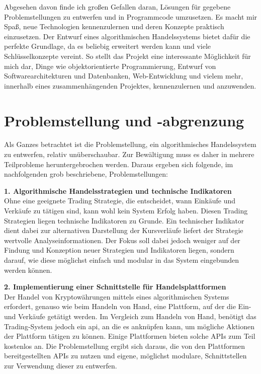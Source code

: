 \documentclass[oneside]{ausarbeitung}
\begin{document}
Abgesehen davon finde ich großen Gefallen daran, Lösungen für gegebene Problemstellungen zu entwerfen und in Programmcode umzusetzen. Es macht mir Spaß, neue Technologien kennenzulernen und deren Konzepte praktisch einzusetzen. Der Entwurf eines algorithmischen Handelssystems bietet dafür die perfekte Grundlage, da es beliebig erweitert werden kann und viele Schlüsselkonzepte vereint. So stellt das Projekt eine interessante Möglichkeit für mich dar, Dinge wie objektorientierte Programmierung, Entwurf von Softwarearchitekturen und Datenbanken, Web-Entwicklung und vielem mehr, innerhalb eines zusammenhängenden Projektes, kennenzulernen und anzuwenden.

\section{Problemstellung und -abgrenzung}
\label{sec:problemstellung}

Als Ganzes betrachtet ist die Problemstellung, ein algorithmisches Handelssystem zu entwerfen, relativ unüberschaubar. Zur Bewältigung muss es daher in mehrere Teilprobleme heruntergebrochen werden. Daraus ergeben sich folgende, im nachfolgenden grob beschriebene, Problemstellungen:

\textbf{1. Algorithmische Handelsstrategien und technische Indikatoren} \\
Ohne eine geeignete Trading Strategie, die entscheidet, wann Einkäufe und Verkäufe zu tätigen sind, kann wohl kein System Erfolg haben. Diesen Trading Strategien liegen technische Indikatoren zu Grunde. Ein technischer Indikator dient dabei zur alternativen Darstellung der Kursverläufe liefert der Strategie wertvolle Analyseinformationen. Der Fokus soll dabei jedoch weniger auf der Findung und Konzeption neuer Strategien und Indikatoren liegen, sondern darauf, wie diese möglichst einfach und modular in das System eingebunden werden können.

\textbf{2. Implementierung einer Schnittstelle für Handelsplattformen} \\
Der Handel von Kryptowährungen mittels eines algorithmischen Systems erfordert, genauso wie beim Handeln von Hand, eine Plattform, auf der die Ein- und Verkäufe getätigt werden. Im Vergleich zum Handeln von Hand, benötigt das Trading-System jedoch ein \ac{api}, an die es anknüpfen kann, um mögliche Aktionen der Plattform tätigen zu können. Einige Plattformen bieten solche APIs zum Teil kostenlos an. Die Problemstellung ergibt sich daraus, die von den Plattformen bereitgestellten APIs zu nutzen und eigene, möglichst modulare, Schnittstellen zur Verwendung dieser zu entwerfen.
\end{document}
